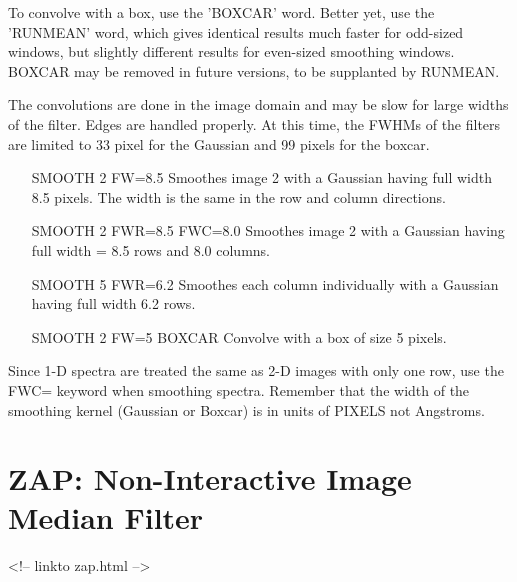 To convolve with a box, use the 'BOXCAR' word. Better yet, use the
'RUNMEAN' word, which gives identical results much faster for odd-sized
windows, but slightly different results for even-sized smoothing windows.
BOXCAR may be removed in future versions, to be supplanted by RUNMEAN.

The convolutions are done in the image domain and may be slow for large
widths of the filter.  Edges are handled properly.  At this time, the
FWHMs of the filters are limited to 33 pixel for the Gaussian and 99
pixels for the boxcar.

\begin{itemize}
  \item[SMOOTH 2 FW=8.5\hfill]{Smoothes image 2 with a Gaussian having
       full width 8.5 pixels.  The width is
       the same in the row and column directions.}
  \item[SMOOTH 2 FWR=8.5 FWC=8.0\hfill]{Smoothes image 2 with a Gaussian
       having full width = 8.5 rows and 8.0 columns.}
  \item[SMOOTH 5 FWR=6.2\hfill]{Smoothes each column individually with a
       Gaussian having full width 6.2 rows.}
  \item[SMOOTH 2 FW=5 BOXCAR\hfill]{Convolve with a box of size 5 pixels.}
\end{itemize}

Since 1-D spectra are treated the same as 2-D images with only one row, use
the FWC= keyword when smoothing spectra.  Remember that the width of the
smoothing kernel (Gaussian or Boxcar) is in units of PIXELS not Angstroms.

\section{ZAP: Non-Interactive Image Median Filter}
\begin{rawhtml}
<!-- linkto zap.html -->
\end{rawhtml}

